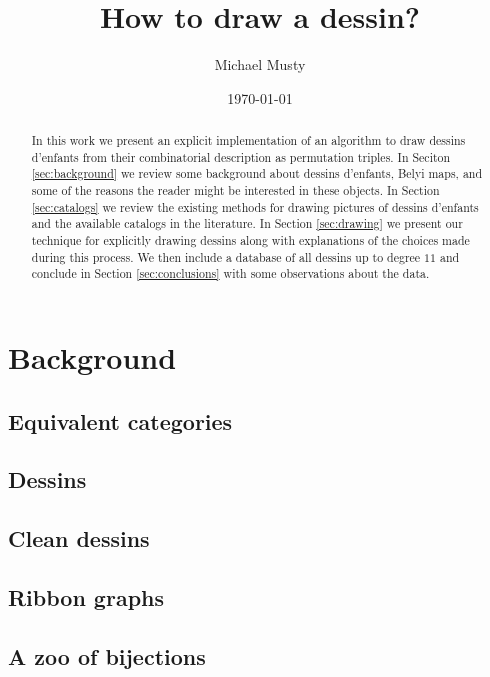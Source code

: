 \documentclass{amsart}
\numberwithin{equation}{section}
\theoremstyle{definition}
\theoremstyle{remark}
\begin{document}
\title{How to draw a dessin?}

\author{Michael Musty}
\address{Fall 2019 at ICERM, 121 S Main Street, Providence, RI 02903}

\date{\today}

\begin{abstract}
  In this work we present an explicit implementation
  of an algorithm to draw dessins d'enfants from their
  combinatorial description as permutation triples.
  In Seciton \ref{sec:background}
  we review some background about dessins d'enfants,
  Belyi maps, and some of the reasons the reader
  might be interested in these objects.
  In Section \ref{sec:catalogs}
  we review the existing methods for drawing
  pictures of dessins d'enfants and the available
  catalogs in the literature.
  In Section \ref{sec:drawing}
  we present our technique for explicitly drawing
  dessins along with explanations of the choices
  made during this process.
  We then include a database
  of all dessins up to degree $11$
  and conclude in Section \ref{sec:conclusions}
  with some observations about the data.
\end{abstract}

\maketitle
\tableofcontents

\section{Background}{\label{sec:background}
  \subsection{Equivalent categories}{
    \subsection{Dessins}{
    }
    \subsection{Clean dessins}{
    }
    \subsection{Ribbon graphs}{
    }
    \subsection{A zoo of bijections}{
    }
  }
}
\end{document}
